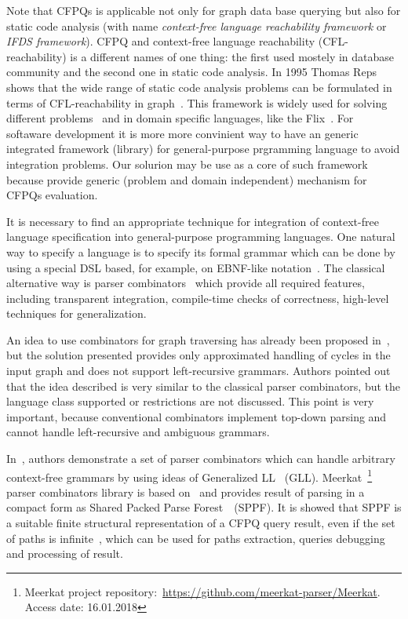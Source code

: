Note that CFPQs is applicable not only for graph data base querying but also for static code analysis (with name \emph{context-free language reachability framework} or  \emph{IFDS framework}).
CFPQ and context-free language reachability (CFL-reachability) is a different names of one thing: the first used mostely in database community and the second one in static code analysis.
In 1995 Thomas Reps shows that the wide range of static code analysis problems can be formulated in terms of CFL-reachability in graph~\cite{Reps:1995, Reps}.
This framework is widely used for solving different problems~\cite{JavaCFL, Zheng, LabelFlowCFLReachability, CFLfinding, CFLTaint, CFLGraspan} and in domain specific languages, like the Flix~\cite{Flix}.
For softaware development it is more more convinient way to have an generic integrated framework (library) for general-purpose prgramming language to avoid integration problems.
Our solurion may be use as a core of such framework because provide generic (problem and domain independent) mechanism for CFPQs evaluation.

It is necessary to find an appropriate technique for integration of context-free language specification into general-purpose programming languages.
One natural way to specify a language is to specify its formal grammar which can be done by using a special DSL based, for example, on EBNF-like notation~\cite{EBNFISO}.
The classical alternative way is parser combinators~\cite{MonadicPArserCombinators} which provide all required features, including transparent integration, compile-time checks of correctness, high-level techniques for generalization.

An idea to use combinators for graph traversing has already been proposed in~\cite{ScalaGraphParsing}, but the solution presented provides only approximated handling of cycles in the input graph and does not support left-recursive grammars. 
Authors pointed out that the idea described is very similar to the classical parser combinators, but the language class supported or restrictions are not discussed.
This point is very important, because conventional combinators implement top-down parsing and cannot handle left-recursive and ambiguous grammars.

In~\cite{Meerkat}, authors demonstrate a set of parser combinators which can handle arbitrary context-free grammars by using ideas of Generalized LL~\cite{scott2010gll} (GLL).
Meerkat~\footnote{Meerkat project repository:~\url{https://github.com/meerkat-parser/Meerkat}. Access date: 16.01.2018} parser combinators library is based on~\cite{Meerkat}
 and provides result of parsing in a compact form as Shared Packed Parse Forest~\cite{SPPF}~(SPPF).
It is showed that SPPF is a suitable finite structural representation of a CFPQ query result, even if the set of paths is infinite~\cite{GrigorevR16}, which can be used for paths extraction, queries debugging and processing of result.

